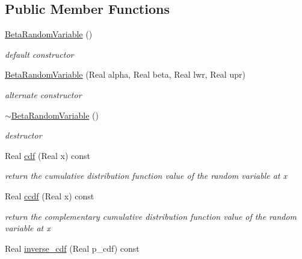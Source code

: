 \subsection*{Public Member Functions}
\begin{DoxyCompactItemize}
\item 
\hyperlink{classPecos_1_1BetaRandomVariable_a7ea24ac2918a0373d5310545dbd6d920}{Beta\+Random\+Variable} ()\label{classPecos_1_1BetaRandomVariable_a7ea24ac2918a0373d5310545dbd6d920}

\begin{DoxyCompactList}\small\item\em default constructor \end{DoxyCompactList}\item 
\hyperlink{classPecos_1_1BetaRandomVariable_a8552ab690ca1a372638c545ff78a3c57}{Beta\+Random\+Variable} (Real alpha, Real beta, Real lwr, Real upr)\label{classPecos_1_1BetaRandomVariable_a8552ab690ca1a372638c545ff78a3c57}

\begin{DoxyCompactList}\small\item\em alternate constructor \end{DoxyCompactList}\item 
\hyperlink{classPecos_1_1BetaRandomVariable_a93506d9a622032552279d3746c2ec9ea}{$\sim$\+Beta\+Random\+Variable} ()\label{classPecos_1_1BetaRandomVariable_a93506d9a622032552279d3746c2ec9ea}

\begin{DoxyCompactList}\small\item\em destructor \end{DoxyCompactList}\item 
Real \hyperlink{classPecos_1_1BetaRandomVariable_addd564e7f4f314e12d38df74d845f0d8}{cdf} (Real x) const \label{classPecos_1_1BetaRandomVariable_addd564e7f4f314e12d38df74d845f0d8}

\begin{DoxyCompactList}\small\item\em return the cumulative distribution function value of the random variable at x \end{DoxyCompactList}\item 
Real \hyperlink{classPecos_1_1BetaRandomVariable_a23c3b599e7e4788a9a5e9e93c3dbaf4d}{ccdf} (Real x) const \label{classPecos_1_1BetaRandomVariable_a23c3b599e7e4788a9a5e9e93c3dbaf4d}

\begin{DoxyCompactList}\small\item\em return the complementary cumulative distribution function value of the random variable at x \end{DoxyCompactList}\item 
Real \hyperlink{classPecos_1_1BetaRandomVariable_a918a1aac05ca349ea5313eebcba46c3e}{inverse\+\_\+cdf} (Real p\+\_\+cdf) const \label{classPecos_1_1BetaRandomVariable_a918a1aac05ca349ea5313eebcba46c3e}


\end{DoxyCompactItemize}
